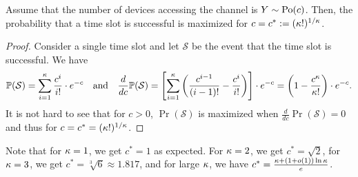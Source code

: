 \begin{lemma}\label{lemma:PoissonApproximation}
  Assume that the number of devices accessing the channel is
  $Y\sim\mathrm{Po}(c)$. Then, the probability that a time slot is successful
  is maximized for $c=c^*:=(\kappa!)^{1/\kappa}$.
\end{lemma}
\begin{proof}
  Consider a single time slot and let $\mathcal{S}$ be the event that
  the time slot is successful. We have
  \[
  \mathbb{P}(\mathcal{S})= \sum_{i=1}^{\kappa}\frac{c^i}{i!}\cdot e^{-c}
  \quad\text{and}\text\quad
  \frac{d}{dc}\mathbb{P}(\mathcal{S}) = 
  \left[\sum_{i=1}^\kappa\left(\frac{c^{i-1}}{(i-1)!}-\frac{c^i}{i!}\right)\right]\cdot
  e^{-c} =
  \left(1-\frac{c^\kappa}{\kappa!}\right)\cdot e^{-c}.
  \]
  It is not hard to see that for $c>0$, $\Pr(\mathcal{S})$ is
  maximized when $\frac{d}{dc}\Pr(\mathcal{S})=0$ and thus for $c=c^*=(\kappa!)^{1/\kappa}$.
\end{proof}

Note that for $\kappa=1$, we get $c^*=1$ as expected. For
$\kappa=2$, we get $c^*=\sqrt{2}$, for $\kappa=3$, we get
$c^*=\sqrt[3]{6}\approx 1.817$, and for large $\kappa$, we have
$c^*=\frac{\kappa+(1+o(1))\ln\kappa}{e}$.

